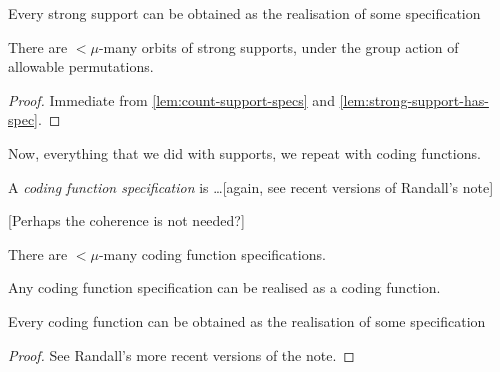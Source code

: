 \begin{lemma}
  \label{lem:strong-support-has-spec}
  Every strong support can be obtained as the realisation of some specification
\end{lemma}

\begin{corollary}
  \label{cor:count-strong-supports}
  There are $<\mu$-many orbits of strong supports, under the group action of allowable permutations.
\end{corollary}

\begin{proof}
  Immediate from \cref{lem:count-support-specs} and \cref{lem:strong-support-has-spec}.
\end{proof}

Now, everything that we did with supports, we repeat with coding functions.

\begin{definition}
  \label{def:coding-function-spec}
  A \emph{coding function specification} is \ldots [again, see recent versions of Randall’s note]

  [Perhaps the coherence is not needed?]
\end{definition}

\begin{lemma}
  \label{lem:count-coding-function-specs}
  There are $<\mu$-many coding function specifications.
\end{lemma}

\begin{definition}
  \label{def:coding-function-spec-realisation}
  Any coding function specification can be realised as a coding function.
\end{definition}

\begin{lemma}
  \label{lem:coding-function-has-spec}
  Every coding function can be obtained as the realisation of some specification
\end{lemma}

\begin{proof}
  See Randall’s more recent versions of the note.
\end{proof}

